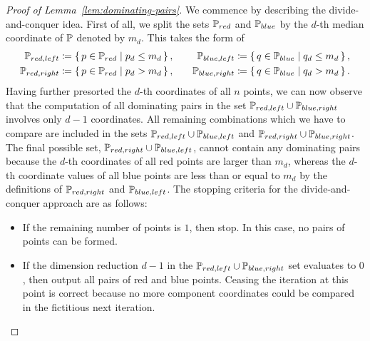 \begin{proof}[Proof of Lemma~\ref{lem:dominating-pairs}]
    We commence by describing the divide-and-conquer idea.
    First of all, we split the sets $\mathbb{P}_{red}$ and $\mathbb{P}_{blue}$ by the $d$-th median coordinate of $\mathbb{P}$ denoted by $m_d$.
    This takes the form of
    \[
        \begin{split}
            \mathbb{P}_{red, left} &\coloneqq \left\{\,p \in \mathbb{P}_{red}\mid p_d \leq m_d\,\right\}, \\
            \mathbb{P}_{red, right} &\coloneqq \left\{\,p \in \mathbb{P}_{red}\mid p_d > m_d\,\right\},
        \end{split}
        \qquad
        \begin{split}
            \mathbb{P}_{blue, left} &\coloneqq \left\{\,q \in \mathbb{P}_{blue}\mid q_d \leq m_d\,\right\}, \\
            \mathbb{P}_{blue, right} &\coloneqq \left\{\,q \in \mathbb{P}_{blue}\mid q_d > m_d\,\right\}.
        \end{split}
    \]
    Having further presorted the $d$-th coordinates of all $n$ points, we can now observe that the computation of all dominating pairs in the set $\mathbb{P}_{red, left} \cup \mathbb{P}_{blue, right}$ involves only $d - 1$ coordinates.
    All remaining combinations which we have to compare are included in the sets $\mathbb{P}_{red, left} \cup \mathbb{P}_{blue, left}$ and $\mathbb{P}_{red, right} \cup \mathbb{P}_{blue, right}$.
    The final possible set, $\mathbb{P}_{red, right} \cup \mathbb{P}_{blue, left}$, cannot contain any dominating pairs because the $d$-th coordinates of all red points are larger than $m_d$, whereas the $d$-th coordinate values of all blue points are less than or equal to $m_d$ by the definitions of $\mathbb{P}_{red, right}$ and $\mathbb{P}_{blue, left}$.
    The stopping criteria for the divide-and-conquer approach are as follows:
    \begin{itemize}
        \item %
            If the remaining number of points is $1$, then stop.
            In this case, no pairs of points can be formed.
        \item %
            If the dimension reduction $d - 1$ in the $\mathbb{P}_{red, left} \cup \mathbb{P}_{blue, right}$ set evaluates to $0$, then output all pairs of red and blue points.
            Ceasing the iteration at this point is correct because no more component coordinates could be compared in the fictitious next iteration.
    \end{itemize}


\end{proof}
